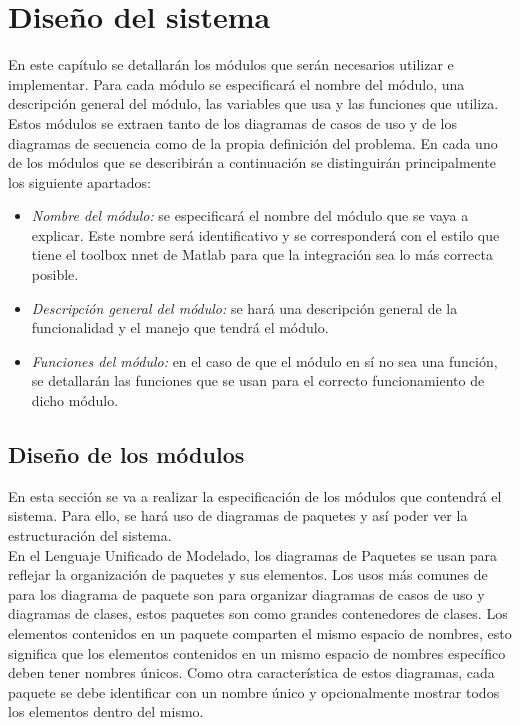 \chapter{Diseño del sistema}
	
	En este capítulo se detallarán los módulos que serán necesarios utilizar e implementar. Para cada módulo se especificará el nombre del módulo, una descripción general del módulo, las variables que usa y las funciones que utiliza. Estos módulos se extraen tanto de los diagramas de casos de uso y de los diagramas de secuencia como de la propia definición del problema. En cada uno de los módulos que se describirán a continuación se distinguirán principalmente los siguiente apartados:
	
	\begin{itemize}
		\item \textit{Nombre del módulo:} se especificará el nombre del módulo que se vaya a explicar. Este nombre será identificativo y se corresponderá con el estilo que tiene el toolbox nnet de Matlab para que la integración sea lo más correcta posible.
		\item \textit{Descripción general del módulo:} se hará una descripción general de la funcionalidad y el manejo que tendrá el módulo.
		\item \textit{Funciones del módulo:} en el caso de que el módulo en sí no sea una función, se detallarán las funciones que se usan para el correcto funcionamiento de dicho módulo.
	\end{itemize}
	
	\section{Diseño de los módulos}
	
		En esta sección se va a realizar la especificación de los módulos que contendrá el sistema. Para ello, se hará uso de diagramas de paquetes y así poder ver la estructuración del sistema.\\
		
		En el Lenguaje Unificado de Modelado, los diagramas de Paquetes se usan para reflejar la organización de paquetes y sus elementos. Los usos más comunes de para los diagrama de paquete son para organizar diagramas de casos de uso y diagramas de clases, estos paquetes son como grandes contenedores de clases.	Los elementos contenidos en un paquete comparten el mismo espacio de nombres, esto significa que los elementos contenidos en un mismo espacio de nombres específico deben tener nombres únicos. Como otra característica de estos diagramas, cada paquete se debe identificar con un nombre único y opcionalmente mostrar todos los elementos dentro del mismo.\\
		
